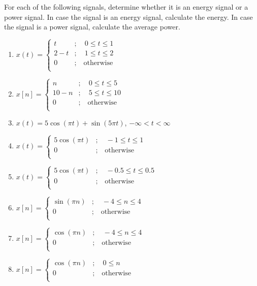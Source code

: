 \documentclass[fleqn, a4paper, 11pt, oneside]{amsart}
\theoremstyle{definition}
\theoremstyle{theorem}
\begin{document}
\begin{question}
	For each of the following signals, determine whether it is an energy signal or a power signal.
	In case the signal is an energy signal, calculate the energy.
	In case the signal is a power signal, calculate the average power.
	\begin{enumerate}
		\item
			$
				x(t) =
					\begin{cases}
						t &;\quad 0 \le t \le 1\\
						2 - t &;\quad 1 \le t \le 2\\
						0 &;\quad \text{otherwise}\\
					\end{cases}
			$
		\item
			$
				x[n] =
					\begin{cases}
						n &;\quad 0 \le t \le 5\\
						10 - n &;\quad 5 \le t \le 10\\
						0 &;\quad \text{otherwise}\\
					\end{cases}
			$
		\item
			$x(t) = 5 \cos(\pi t) + \sin(5 \pi t)$, $-\infty < t < \infty$
		\item
			$
				x(t) =
					\begin{cases}
						5 \cos(\pi t) &;\quad -1 \le t \le 1\\
						0 &;\quad \text{otherwise}\\
					\end{cases}
			$
		\item
			$
				x(t) =
					\begin{cases}
						5 \cos(\pi t) &;\quad -0.5 \le t \le 0.5\\
						0 &;\quad \text{otherwise}\\
					\end{cases}
			$
		\item
			$
				x[n] =
					\begin{cases}
						\sin(\pi n) &;\quad -4 \le n \le 4\\
						0 &;\quad \text{otherwise}\\
					\end{cases}
			$
		\item
			$
				x[n] =
					\begin{cases}
						\cos(\pi n) &;\quad -4 \le n \le 4\\
						0 &;\quad \text{otherwise}\\
					\end{cases}
			$
		\item
			$
				x[n] =
					\begin{cases}
						\cos(\pi n) &;\quad 0 \le n\\
						0 &;\quad \text{otherwise}\\
					\end{cases}
			$
	\end{enumerate}
\end{question}
\end{document}
